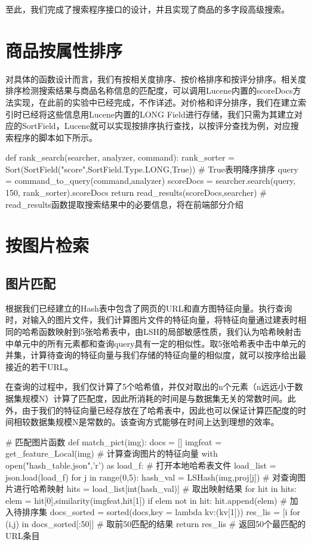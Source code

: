 至此，我们完成了搜索程序接口的设计，并且实现了商品的多字段高级搜索。

\section{商品按属性排序}

对具体的函数设计而言，我们有按相关度排序、按价格排序和按评分排序。相关度排序检测搜索结果与商品名称信息的匹配度，可以调用Lucene内置的scoreDocs方法实现，在此前的实验中已经完成，不作详述。对价格和评分排序，我们在建立索引时已经将这些信息用Lucene内置的LONG Field进行存储，我们只需为其建立对应的SortField，Lucene就可以实现按排序执行查找，以按评分查找为例，对应搜索程序的脚本如下所示。

\begin{python}
def rank_search(searcher, analyzer, command):
    rank_sorter = Sort(SortField("score",SortField.Type.LONG,True))  # True表明降序排序
    query = command_to_query(command,analyzer)
    scoreDocs = searcher.search(query, 150, rank_sorter).scoreDocs
    return read_results(scoreDocs,searcher) 
    # read_results函数提取搜索结果中的必要信息，将在前端部分介绍
\end{python}

\section{按图片检索}

\subsection{图片匹配}
根据我们已经建立的Hash表中包含了网页的URL和直方图特征向量。执行查询时，对输入的图片文件，我们计算图片文件的特征向量，将特征向量通过建表时相同的哈希函数映射到5张哈希表中，由LSH的局部敏感性质，我们认为哈希映射击中单元中的所有元素都和查询query具有一定的相似性。取5张哈希表中击中单元的并集，计算待查询的特征向量与我们存储的特征向量的相似度，就可以按序给出最接近的若干URL。

在查询的过程中，我们仅计算了5个哈希值，并仅对取出的n个元素（n远远小于数据集规模N）计算了匹配度，因此所消耗的时间是与数据集无关的常数时间。此外，由于我们的特征向量已经存放在了哈希表中，因此也可以保证计算匹配度的时间相较数据集规模N是常数的。该查询方式能够在时间上达到理想的效率。

\begin{python}
# 匹配图片函数
def match_pict(img):
    docs = []
    imgfeat = get_feature_Local(img)             # 计算查询图片的特征向量
    with open("hash_table.json",'r') as load_f:  # 打开本地哈希表文件
        load_list = json.load(load_f)
        for j in range(0,5):
            hash_val = LSHash(img,proj[j])       # 对查询图片进行哈希映射
            hits = load_list[int(hash_val)]      # 取出映射结果
            for hit in hits:
                elem = hit[0],similarity(imgfeat,hit[1])
                if elem not in hit:
                    hit.append(elem)             # 加入待排序集
    docs_sorted = sorted(docs,key = lambda kv:(kv[1]))
    res_lis = [i for (i,j) in docs_sorted[:50]]  # 取前50匹配的结果
    return res_lis                               # 返回50个最匹配的URL条目
\end{python}

